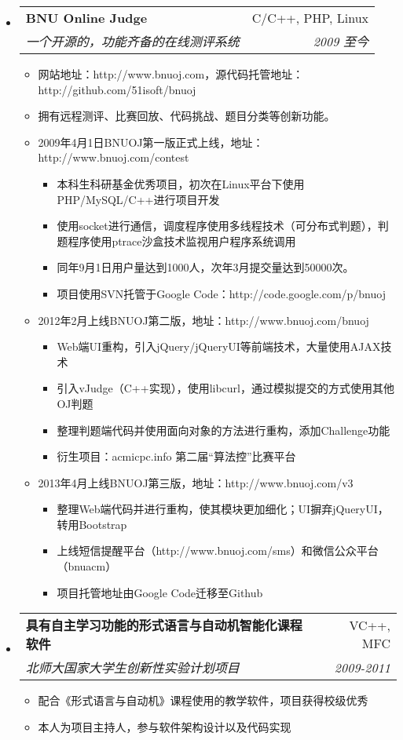 \documentclass[letterpaper,11pt,UTF8,nofonts]{ctexart}
\makeatletter
\newcommand{\resitem}[1]{\item #1 \vspace{-2pt}}
\newcommand{\ressubheading}[4]{
    \begin{tabular*}{6.5in}{l@{\cftdotfill{\cftsecdotsep}\extracolsep{\fill}}r}
        \textbf{#1} & #2 \\
        \textit{#3} & \textit{#4} \\
    \end{tabular*}\vspace{-6pt}
}
\makeatother
\begin{document}
    \begin{itemize}
        \item
            \ressubheading{BNU Online Judge}{C/C++, PHP, Linux}{一个开源的，功能齐备的在线测评系统}{2009 至今}
            \begin{itemize}
                \resitem{网站地址：http://www.bnuoj.com，源代码托管地址：http://github.com/51isoft/bnuoj}
                \resitem{拥有远程测评、比赛回放、代码挑战、题目分类等创新功能。}
                \resitem{2009年4月1日BNUOJ第一版正式上线，地址：http://www.bnuoj.com/contest}
                \begin{itemize}
                    \resitem{本科生科研基金优秀项目，初次在Linux平台下使用PHP/MySQL/C++进行项目开发}
                    \resitem{使用socket进行通信，调度程序使用多线程技术（可分布式判题），判题程序使用ptrace沙盒技术监视用户程序系统调用}
                    \resitem{同年9月1日用户量达到1000人，次年3月提交量达到50000次。}
                    \resitem{项目使用SVN托管于Google Code：http://code.google.com/p/bnuoj}
                \end{itemize}
                \resitem{2012年2月上线BNUOJ第二版，地址：http://www.bnuoj.com/bnuoj}
                \begin{itemize}
                    \resitem{Web端UI重构，引入jQuery/jQueryUI等前端技术，大量使用AJAX技术}
                    \resitem{引入vJudge（C++实现），使用libcurl，通过模拟提交的方式使用其他OJ判题}
                    \resitem{整理判题端代码并使用面向对象的方法进行重构，添加Challenge功能}
                    \resitem{衍生项目：acmicpc.info 第二届“算法控”比赛平台}
                \end{itemize}
                \resitem{2013年4月上线BNUOJ第三版，地址：http://www.bnuoj.com/v3}
                \begin{itemize}
                    \resitem{整理Web端代码并进行重构，使其模块更加细化；UI摒弃jQueryUI，转用Bootstrap}
                    \resitem{上线短信提醒平台（http://www.bnuoj.com/sms）和微信公众平台（bnuacm）}
                    \resitem{项目托管地址由Google Code迁移至Github}
                \end{itemize}
            \end{itemize}
        \item
            \ressubheading{具有自主学习功能的形式语言与自动机智能化课程软件}{VC++, MFC}{北师大国家大学生创新性实验计划项目}{2009-2011}
            \begin{itemize}
                \resitem{配合《形式语言与自动机》课程使用的教学软件，项目获得校级优秀}
                \resitem{本人为项目主持人，参与软件架构设计以及代码实现}
            \end{itemize}
    \end{itemize}
\end{document}
